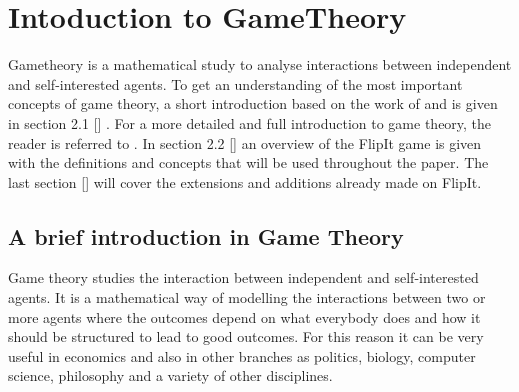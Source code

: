 \chapter{Intoduction to GameTheory}
\label{cha:1}
%


Gametheory is a mathematical study to analyse interactions between independent and self-interested agents. To get an understanding of the most important concepts of game theory, a short introduction based on the work of 
\citep{leyton2008essentials} and  is given in section 2.1 [] . For a more detailed and full introduction to game theory, the reader is referred to 
.  In section 2.2 []  an overview of the FlipIt game is given with the definitions and concepts that will be used throughout the paper.
The last section []  will cover the extensions and additions already made on FlipIt.

\section{A brief introduction in Game Theory}
\label{Cha:1:Intro.Game.Theory}




Game theory studies the interaction between independent and self-interested agents. It is a mathematical way of modelling the interactions between two or more agents where the outcomes depend on what everybody does and how it should be structured to lead to good outcomes. For this reason it can be very useful in economics and also in other branches as politics, biology, computer science, philosophy and a variety of other disciplines.  \\

